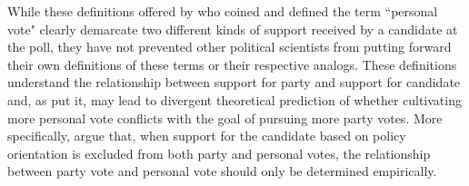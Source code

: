\documentclass[hyphens, crop=false]{standalone}
\begin{document}
		While
		these definitions offered by
		\citeauthor{cainPersonalVoteConstituency1987}
		\autocite*{cainPersonalVoteConstituency1987}
		who coined and defined the term ``personal vote"
		clearly demarcate two different kinds of support
		received by a candidate at the poll,
		they have not prevented other political scientists from
		putting forward their own definitions of these terms or their respective analogs.
		These definitions
		understand the relationship between support for party and support for candidate and,
		as
		\citeauthor{carseyRethinkingNormalVote2017}
		\autocite*{carseyRethinkingNormalVote2017}
		put it,
		may lead to divergent theoretical prediction
		of whether cultivating more personal vote conflicts with the goal of pursuing more party votes.
		More specifically,
		\citeauthor{carseyRethinkingNormalVote2017}
		\autocite*{carseyRethinkingNormalVote2017}
		argue that,
		when support for the candidate
		based on policy orientation is excluded from both party and personal votes,
		the relationship between party vote and personal vote
		should only be determined empirically.
\end{document}

